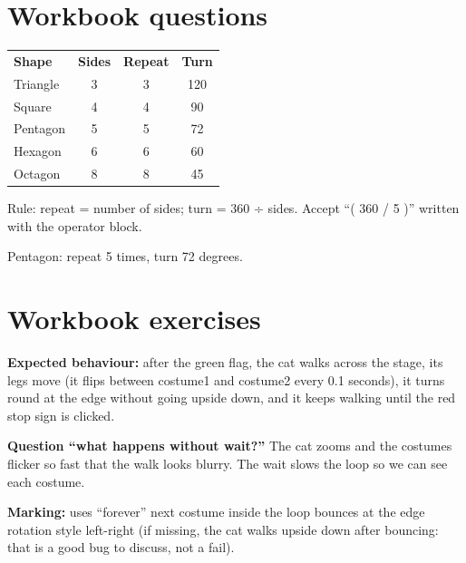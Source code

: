
\section{Workbook questions}
\begin{answer}
\begin{tabular}{@{}lccc@{}}
\textbf{Shape} & \textbf{Sides} & \textbf{Repeat} & \textbf{Turn} \\
Triangle & 3 & 3 & 120 \\
Square & 4 & 4 & 90 \\
Pentagon & 5 & 5 & 72 \\
Hexagon & 6 & 6 & 60 \\
Octagon & 8 & 8 & 45 \\
\end{tabular}

Rule: repeat = number of sides; turn = 360 ÷ sides. Accept \enquote{( 360 / 5 )} written with the operator block.
\end{answer}

\begin{answer}
Pentagon: repeat 5 times, turn 72 degrees.
\end{answer}

\section{Workbook exercises}
\begin{answer}
\textbf{Expected behaviour:} after the green flag, the cat walks across the stage, its legs move (it flips between costume1 and costume2 every 0.1 seconds), it turns round at the edge without going upside down, and it keeps walking until the red stop sign is clicked.

\textbf{Question \enquote{what happens without wait?}} The cat zooms and the costumes flicker so fast that the walk looks blurry. The wait slows the loop so we can see each costume.

\textbf{Marking:} \tickbox{} uses \enquote{forever} \quad \tickbox{} next costume inside the loop \quad \tickbox{} bounces at the edge \quad \tickbox{} rotation style left-right (if missing, the cat walks upside down after bouncing: that is a good bug to discuss, not a fail).
\end{answer}

